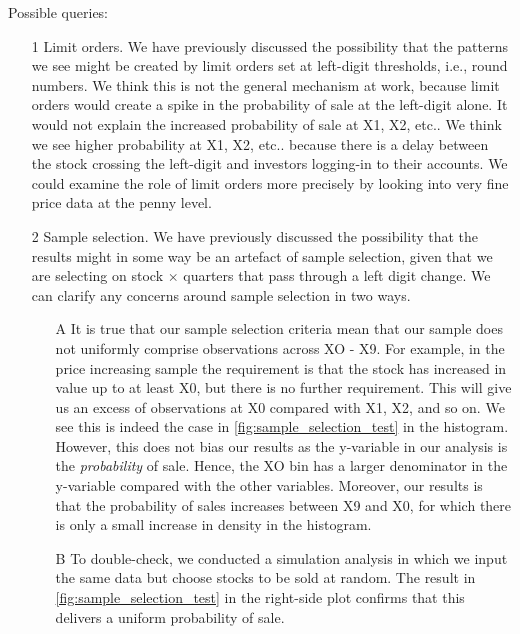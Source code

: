Possible queries:
\begin{itemize}
	\item [1] Limit orders. We have previously discussed the possibility that the patterns we see might be created by limit orders set at left-digit thresholds, i.e., round numbers. We think this is not the general mechanism at work, because limit orders would create a spike in the probability of sale at the left-digit alone. It would not explain the increased probability of sale at X1, X2, etc.. We think we see higher probability at X1, X2, etc.. because there is a delay between the stock crossing the left-digit and investors logging-in to their accounts. We could examine the role of limit orders more precisely by looking into very fine price data at the penny level.
	\item [2] Sample selection. We have previously discussed the possibility that the results might in some way be an artefact of sample selection, given that we are selecting on stock $\times$ quarters that pass through a left digit change. We can clarify any concerns around sample selection in two ways. 
	\begin{itemize}
		\item [A] It is true that our sample selection criteria mean that our sample does not uniformly comprise observations across XO - X9. For example, in the price increasing sample the requirement is that the stock has increased in value up to at least X0, but there is no further requirement. This will give us an excess of observations at X0 compared with X1, X2, and so on. We see this is indeed the case in \ref{fig:sample_selection_test} in the histogram. However, this does not bias our results as the y-variable in our analysis is the \textit{probability} of sale. Hence, the XO bin has a larger denominator in the y-variable compared with the other variables. Moreover, our results is that the probability of sales increases between X9 and X0, for which there is only a small increase in density in the histogram.
		\item [B] To double-check, we conducted a simulation analysis in which we input the same data but choose stocks to be sold at random. The result in \ref{fig:sample_selection_test} in the right-side plot confirms that this delivers a uniform probability of sale. 
	\end{itemize}
\end{itemize}

